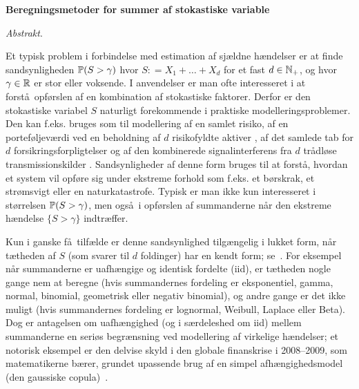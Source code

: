 \newpage

\begin{center}
{\large \bfseries Beregningsmetoder for summer af stokastiske variable}

\medskip
{\em Abstrakt\/}.
\end{center}

Et typisk problem i forbindelse med estimation af sj{\ae}ldne h{\ae}ndelser er at finde sandsynligheden $\operatorname{{\mathbb P}} (S> \gamma)$ hvor $S: = X_1 + \dots + X_d$ for et fast $d \in \mathbb{N}_+$, og hvor $\gamma \in \mathbb{R}$ er stor eller voksende. I anvendelser er man ofte interesseret i at forst\aa\ opf{\o}rslen af en kombination af stokastiske faktorer. Derfor er den stokastiske variabel $S$ naturligt forekommende i praktiske modelleringsproblemer.
Den kan f.eks. bruges som til modellering af en samlet risiko, af en portef{\o}ljev{\ae}rdi ved en beholdning af $d$ risikofyldte aktiver \cite {mcneil2015quantitative, Rueschendorf2013}, af det samlede tab for $d$ forsikringsforpligtelser \cite {asmussen2010ruin, klugman2012loss} og af den kombinerede signalinterferens fra $d$ tr{\aa}dl{\o}se transmissionskilder \cite {fischione2007approximation}.
Sandsynligheder af denne form bruges til at forst\aa , hvordan et system vil opf{\o}re sig under ekstreme forhold som f.eks. et b\o rskrak, et str\o msvigt eller en naturkatastrofe. Typisk er man ikke kun interesseret i st\o rrelsen $\operatorname{{\mathbb P}} (S> \gamma) $, men ogs\aa\ i opf{\o}rslen af summanderne n\aa r den ekstreme h\ae ndelse $\{S> \gamma \}$ indtr\ae ffer.

Kun i ganske f\aa\ tilf\ae lde er denne sandsynlighed tilg\ae ngelig i lukket form, n\aa r t{\ae}theden af $S$ (som svarer til $d$ foldinger) har en kendt form; se~\cite {nadarajah2008review}.
For eksempel n\aa r summanderne er uafh{\ae}ngige og identisk fordelte (iid), er t\ae theden nogle gange nem at beregne (hvis summandernes fordeling er eksponentiel, gamma, normal, binomial, geometrisk eller negativ binomial), og andre gange er det ikke muligt (hvis summandernes fordeling er lognormal, Weibull, Laplace eller Beta).
Dog er antagelsen om uafh{\ae}ngighed (og i s\ae rdeleshed om iid) mellem summanderne en seri\o s begr{\ae}nsning ved modellering af virkelige h{\ae}ndelser; et notorisk eksempel er den delvise skyld i den globale finanskrise i 2008--2009, som matematikerne b{\ae}rer, grundet upassende brug af en simpel afh{\ae}ngighedsmodel (den gaussiske copula)~\cite {salmon2009recipe}.

